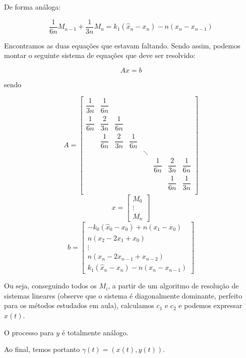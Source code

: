 \documentclass{article}
\begin{document}
\begin{enumerate}
\begin{enumerate}
                    De forma análoga:

                    $$\dfrac{1}{6n}M_{n-1} + \dfrac{1}{3n}M_n = k_1 (\hat{x}_n - x_n) - n(x_n - x_{n-1})$$

                    Encontramos as duas equações que estavam faltando. Sendo assim, podemos montar o seguinte
                    sistema de equações que deve ser resolvido:

                    $$Ax = b$$

                    sendo

                    $$A = \begin{bmatrix}
                        \dfrac{1}{3n} & \dfrac{1}{6n}  \\[6pt]
                        \dfrac{1}{6n} & \dfrac{2}{3n} & \dfrac{1}{6n}  \\[6pt]
                        & \dfrac{1}{6n} & \dfrac{2}{3n} & \dfrac{1}{6n}  \\[6pt]
                        & & & & \ddots \\[6pt]
                        & & & & & \dfrac{1}{6n} & \dfrac{2}{3n} & \dfrac{1}{6n}  \\[6pt]
                        & & & & & & \dfrac{1}{6n} & \dfrac{1}{3n}  \\[6pt]
                        \end{bmatrix}$$
                    $$x = \begin{bmatrix}
                            M_0 \\
                            \vdots \\
                            M_n
                        \end{bmatrix}$$
                    $$b = \begin{bmatrix}
                            -k_0(\hat{x}_0 - x_0) + n(x_1 - x_0) \\
                            n(x_{2} - 2x_1 + x_{0}) \\
                            \vdots \\
                            n(x_n - 2x_{n-1} + x_{n-2}) \\
                            k_1 (\hat{x}_n - x_n) - n(x_n - x_{n-1})
                        \end{bmatrix}$$

                    Ou seja, conseguindo todos os $M_i$, a partir de um algoritmo
                    de resolução de sistemas lineares (observe que o sistema
                    é diagonalmente dominante, perfeito para os métodos estudados
                    em aula), calculamos $c_1$ e $c_2$ e podemos
                    expressar $x(t)$.

                    O processo para $y$ é totalmente análogo.

                    Ao final, temos portanto $\gamma(t) = (x(t), y(t))$.
                                        
            \end{enumerate}

    \end{enumerate}
\end{document}
